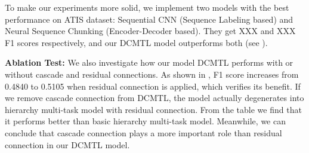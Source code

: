 To make our experiments more solid, 
we implement two models with the best performance on ATIS dataset: 
Sequential CNN \cite{vu2016sequential} (Sequence Labeling based) and Neural Sequence Chunking \cite{zhai2017neural} (Encoder-Decoder based).
They get XXX and XXX F1 scores respectively, and our DCMTL model outperforms both (see ).

\noindent
\textbf{Ablation Test:}
We also investigate how our model DCMTL performs 
with or without cascade and residual connections.
As shown in ,
F1 score increases from 0.4840 to 0.5105 when residual connection is applied,
which verifies its benefit.
If we remove cascade connection from DCMTL,
the model actually degenerates into hierarchy multi-task model with residual connection.
From the table we find that it performs better than basic hierarchy multi-task model.
Meanwhile, we can conclude that 
cascade connection plays a more important role than residual connection in our DCMTL model.


